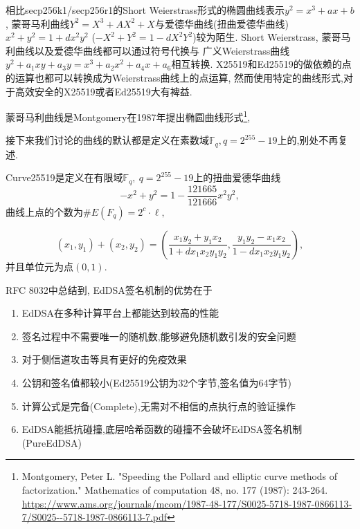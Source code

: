 \documentclass{article}
\newcommand{\F}{\mathbb{F}}
\begin{document}
相比secp256k1/secp256r1的Short Weierstrass形式的椭圆曲线表示$y^2 = x^3 + ax + b$,
蒙哥马利曲线$Y^2 = X^3 + AX^2 + X$与爱德华曲线(扭曲爱德华曲线) 
$x^2+y^2 = 1  + dx^2y^2$ ($-X^2+Y^2 = 1  - dX^2Y^2$)较为陌生.
Short Weierstrass, 蒙哥马利曲线以及爱德华曲线都可以通过符号代换与
广义Weierstrass曲线$y^2 + a_1xy + a_3y = x^3 + a_2x^2 + a_4x + a_6$相互转换.
X25519和Ed25519的做依赖的点的运算也都可以转换成为Weierstrass曲线上的点运算,
然而使用特定的曲线形式,对于高效安全的X25519或者Ed25519大有裨益.

蒙哥马利曲线是Montgomery在1987年提出椭圆曲线形式\footnote{
Montgomery, Peter L. "Speeding the Pollard and elliptic curve methods of factorization." 
Mathematics of computation 48, no. 177 (1987): 243-264. 
\url{https://www.ams.org/journals/mcom/1987-48-177/S0025-5718-1987-0866113-7/S0025--5718-1987-0866113-7.pdf}
},

接下来我们讨论的曲线的默认都是定义在素数域$\F_q, q = 2^{255}-19$上的,别处不再复述.

Curve25519是定义在有限域$\F_q, \ q = 2^{255}-19$上的扭曲爱德华曲线
$$-x^2 + y^2 = 1 - \frac{121665}{121666}x^2y^2,$$
曲线上点的个数为$\#E(F_q)=2^c\cdot\ell, $

$$
(x_1, y_1) + (x_2, y_2) = \left( \frac{x_1y_2 + y_1x_2}{1 + dx_1x_2y_1y_2}, \frac{y_1y_2 - x_1x_2}{1-dx_1x_2y_1y_2} \right),
$$
并且单位元为点$(0,1)$.

RFC 8032中总结到, EdDSA签名机制的优势在于
\begin{enumerate}
\item EdDSA在多种计算平台上都能达到较高的性能
\item 签名过程中不需要唯一的随机数,能够避免随机数引发的安全问题
\item 对于侧信道攻击等具有更好的免疫效果
\item 公钥和签名值都较小(Ed25519公钥为32个字节,签名值为64字节)
\item 计算公式是完备(Complete),无需对不相信的点执行点的验证操作
\item EdDSA能抵抗碰撞,底层哈希函数的碰撞不会破坏EdDSA签名机制(PureEdDSA)
\end{enumerate}
\end{document}
